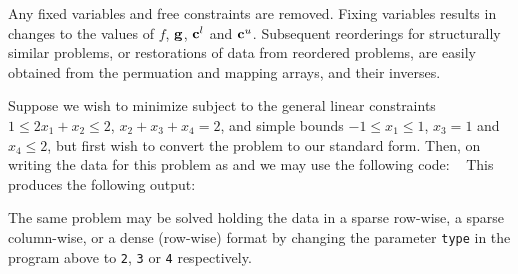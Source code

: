 \documentclass{galahad}
\begin{document}
Any fixed variables and free constraints are removed. Fixing variables
results in changes to the values of $f$, ${\mathbf{g}}$, ${\mathbf{c}}^l$ and ${\mathbf{c}}^u$.
Subsequent reorderings for structurally similar problems, or restorations
of data from reordered problems,
are easily obtained from the permuation and mapping arrays, and their inverses.


\galexample
Suppose we wish to minimize
subject to the general linear constraints
$1 \leq 2 x_1 + x_2 \leq 2$,
$x_2 + x_3 + x_4 = 2$, and simple bounds
$-1 \leq x_1 \leq 1$, $x_3 = 1$ and $x_4 \leq 2$, but first wish to
convert the problem to our standard form.
Then, on writing the data for this problem as
and
we may use the following code:
{\tt \small
\VerbatimInput{\packageexample}
}
\noindent
This produces the following output:
{\tt \small
\VerbatimInput{\packageresults}
}
\noindent

The same problem may be solved holding the data in a sparse row-wise, a sparse
column-wise, or a dense (row-wise) format by changing the parameter
{\tt type} in the program above to {\tt 2}, {\tt 3} or {\tt 4}
respectively.
\end{document}
